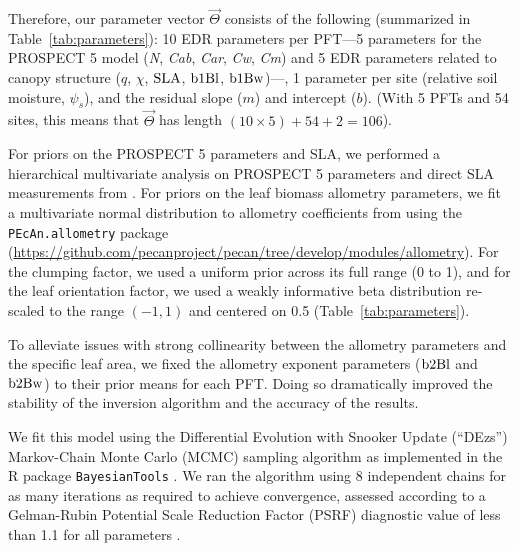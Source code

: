 Therefore, our parameter vector $\vec{\Theta}$ consists of the following (summarized in Table~\ref{tab:parameters}):
10 EDR parameters per PFT---5 parameters for the PROSPECT 5 model (\emph{N}, \emph{Cab}, \emph{Car}, \emph{Cw}, \emph{Cm}) and 5 EDR parameters related to canopy structure ($q$, $\chi$, $\mathrm{SLA}$, $\mathrm{b1Bl}$, $\mathrm{b1Bw}$)---,
1 parameter per site (relative soil moisture, $\psi_{s}$),
and the residual slope ($m$) and intercept ($b$).
(With 5 PFTs and 54 sites, this means that $\vec{\Theta}$ has length $(10 \times 5) + 54 + 2 = 106$).

For priors on the PROSPECT 5 parameters and SLA, we performed a hierarchical multivariate analysis \citep{shiklomanov2020does} on PROSPECT 5 parameters and direct SLA measurements from \citep[][Chapter 3]{shiklomanov_dissertation}.
For priors on the leaf biomass allometry parameters, we fit a multivariate normal distribution to allometry coefficients from \citet{jenkins2003nationalscale,jenkins2004comprehensive} using the \texttt{PEcAn.allometry} package (\url{https://github.com/pecanproject/pecan/tree/develop/modules/allometry}).
For the clumping factor, we used a uniform prior across its full range (0 to 1), and for the leaf orientation factor, we used a weakly informative beta distribution re-scaled to the range $(-1, 1)$ and centered on 0.5 (Table~\ref{tab:parameters}).

To alleviate issues with strong collinearity between the allometry parameters and the specific leaf area, we fixed the allometry exponent parameters ($\mathrm{b2Bl}$ and $\mathrm{b2Bw}$) to their prior means for each PFT.
Doing so dramatically improved the stability of the inversion algorithm and the accuracy of the results.

We fit this model using the Differential Evolution with Snooker Update (``DEzs'') Markov-Chain Monte Carlo (MCMC) sampling algorithm \citep{terbraak2008differential} as implemented in the R package \texttt{BayesianTools} \citep{bayesiantools}.
We ran the algorithm using 8 independent chains for as many iterations as required to achieve convergence, assessed according to a Gelman-Rubin Potential Scale Reduction Factor (PSRF) diagnostic value of less than 1.1 for all parameters \citep{gelman1992inference}.

